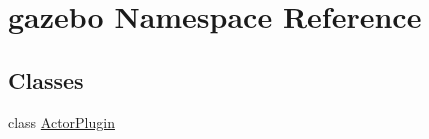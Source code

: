 \hypertarget{namespacegazebo}{}\section{gazebo Namespace Reference}
\label{namespacegazebo}
\subsection*{Classes}
\begin{DoxyCompactItemize}
\item 
class \mbox{\hyperlink{classgazebo_1_1ActorPlugin}{Actor\+Plugin}}
\end{DoxyCompactItemize}
